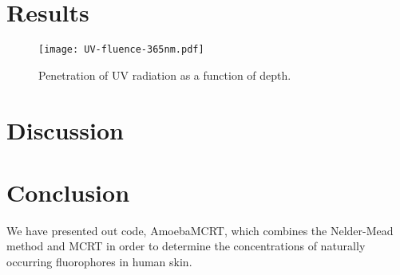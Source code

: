 \section{Results}

\begin{figure}[!htpb]
    \centering
    \texttt{[image: UV-fluence-365nm.pdf]}
    \caption{Penetration of UV radiation as a function of depth.}
    \label{fig:uvpen}
\end{figure}

\section{Discussion}
\section{Conclusion}

We have presented out code, AmoebaMCRT, which combines the Nelder-Mead method and MCRT in order to determine the concentrations of naturally occurring fluorophores in human skin.



